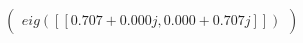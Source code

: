 \documentclass[border=1em]{standalone}
\begin{document}
$
\left(
\begin{array}{cc}
e
i
g
(
[
[
0
.
7
0
7
+
0
.
0
0
0
j
,
 
0
.
0
0
0
+
0
.
7
0
7
j
]
]
)
\end{array}
\right)
$
\end{document}
